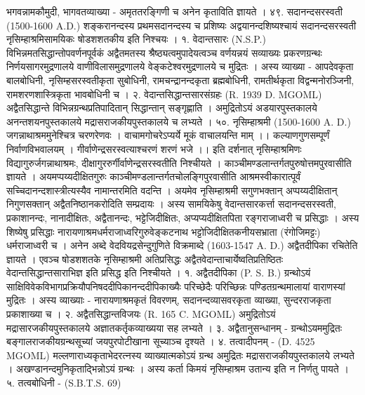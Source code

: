 भगवन्नामकौमुदी, भागवतव्याख्या - अमृततरङ्गिणी च अनेन कृताविति ज्ञायते ।
४९. सदानन्दसरस्वती (1500-1600 A.D.)
शङ्करानन्दस्य प्रथमसदानन्दस्य च प्रशिष्यः अद्वयानन्दशिष्यश्चायं सदानन्दसरस्वती नृसिम्हाश्रमिसामयिकः षोडशशतकीय इति निश्चयः ।
१. वेदान्तसारः (N.S.P.)
विभिन्नमतसिद्धान्तोपवर्णनपूर्वकं अद्वैतमतस्य श्रैष्ठ्यत्वमुपादेयत्वञ्च वर्णयन्नयं सव्याख्यः प्रकरणग्रन्थः निर्णयसागरमुद्रणालये वाणीविलासमुद्रणालये वेङ्कटेश्वरमुद्रणालये च मुद्रितः । अस्य व्याख्या - आपदेवकृता बालबोधिनी, नृसिम्हसरस्वतीकृता सुबोधिनी, रामचन्द्रानन्दकृता ब्रह्मबोधिनी, रामतीर्थकृता विद्वन्मनोरञ्जिनी, रामशरणशास्त्रिकृता भावबोधिनी च ।
२. वेदान्तसिद्धान्तसारसंग्रहः (R. 1939 D. MGOML)
अद्वैतसिद्धान्ते विभिन्नग्रन्थप्रतिपादितान् सिद्धान्तान् सङ्गृह्णाति । अमुद्रितोऽयं अडयारपुस्तकालये अनन्तशयनपुस्तकालये मद्रासराजकीयपुस्तकालये च लभ्यते ।
५०. नृसिम्हाश्रमी (1500-1600 A. D.)
जगन्नाथाश्रममुनेश्चित्र चरणरेणवः । वाचामगोचरेऽप्यर्ये मूकं वाचालयन्ति माम् ।। कल्याणगुणसम्पूर्णं निर्वाणविभवालयम् । गीर्वाणेन्द्रसरस्वत्याश्चरणं शरणं भजे ।।
इति दर्शनात् नृसिम्हाश्रमिणः विद्यागुरुर्जगन्नाथाश्रमः, दीक्षागुररुर्गीर्वाणेन्द्रसरस्वतीति निश्चीयते । काञ्चीमण्डलान्तर्गतपुरुषोत्तमपुरवासीति ज्ञायते । अयमप्पय्यदीक्षितगुरुः काञ्चीमण्डलान्तर्गतचोलङ्गिपुरवासीति आश्रमस्वीकारात्पूर्वं सच्चिदानन्दशास्त्रीत्यस्यैव नामान्तरमिति वदन्ति । अयमेव नृसिम्हाश्रमी सगुणभक्तान् अप्पय्यदीक्षितान् निगुणसक्तान् अद्वैतनिष्ठानकरोदिति सम्प्रदायः ।
अस्य सामयिकेषु वेदान्तसारकर्त्ता सदानन्दसरस्वती, प्रकाशानन्दः, नानादीक्षितः, अद्वैतानन्दः, भट्टेजिदीक्षितः, अप्यप्यदीक्षितपिता रङ्गराजाध्वरी च प्रसिद्धाः । अस्य शिष्येषु प्रसिद्धाः नारायणाश्रमधर्मराजाध्वरिगुरुवेङ्कटनाथ भट्टोजिदीक्षितकनीयसभ्राता (रंगोजिमट्टः) धर्मराजाध्वरी च ।
अनेन अब्दे वेदवियद्रसेन्दुगुणिते विक्रमाब्दे (1603-1547 A. D.) अद्वैतदीपिका रचितेति ज्ञायते । एवञ्च षोडशशतके नृसिम्हाश्रमी अतिप्रसिद्धः अद्वैतवेदान्ताचार्येष्वतिप्रतिष्ठितः वेदान्तसिद्धान्तसाराभिज्ञ इति प्रसिद्ध इति निश्चीयते ।
१. अद्वैतदीपिका (P. S. B.)
ग्रन्थोऽयं साक्षिविवेकविभागप्रक्रियौपनिषददीपिकानन्ददीपिकाख्यैः परिच्छेदैः परिच्छिन्नः पण्डितग्रन्थमालायां वाराणस्यां मुद्रितः । अस्य व्याख्याः - नारायणाश्रमकृतं विवरणम्, सदानन्दव्यासवरकृता व्याख्या, सुन्दरराजकृता प्रकाशाख्या च ।
२. अद्वैतसिद्धान्तविजयः (R. 165 C. MGOML)
अमुद्रितोऽयं मद्रासारजकीयपुस्तकालये अज्ञातकर्तृकव्याख्यया सह लभ्यते ।
३. अद्वैतानुसन्धानम् - ग्रन्थोऽयममुद्रितः बङ्गालराजकीयग्रन्थसूच्यां जयपुरपोटीखाना सूच्याञ्च दृश्यते ।
४. तत्वादीपनम् - (D. 4525 MGOML)
मल्लणाराध्यकृताभेदरत्नस्य व्याख्यात्मकोऽयं ग्रन्थ अमुद्रितः मद्रासराजकीयपुस्तकालये लभ्यते । अखण्डानन्दमुनिकृताद्भिन्नोऽयं ग्रन्थः । अस्य कर्ता किमयं नृसिम्हाश्रम उतान्य इति न निर्णतु पायते ।
५. तत्वबोधिनी - (S.B.T.S. 69)
